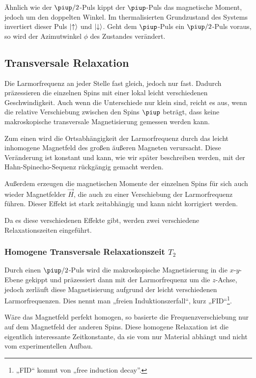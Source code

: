Ähnlich wie der $\piup/2$-Puls kippt der $\piup$-Puls das magnetische Moment,
jedoch um den doppelten Winkel. Im thermalisierten Grundzustand des Systems
invertiert dieser Puls $\ket\uparrow$ und $\ket\downarrow$. Geht dem
$\piup$-Puls ein $\piup/2$-Puls voraus, so wird der Azimutwinkel $\phi$ des
Zustandes verändert.

\subsection{Transversale Relaxation}

Die Larmorfrequenz an jeder Stelle fast gleich, jedoch nur fast. Dadurch
präzessieren die einzelnen Spins mit einer lokal leicht verschiedenen
Geschwindigkeit. Auch wenn die Unterschiede nur klein sind, reicht es aus, wenn
die relative Verschiebung zwischen den Spins $\piup$ beträgt, dass keine
makroskopische transversale Magnetisierung gemessen werden kann.

Zum einen wird die Ortsabhängigkeit der Larmorfrequenz durch das leicht
inhomogene Magnetfeld des großen äußeren Magneten verursacht. Diese Veränderung
ist konstant und kann, wie wir später beschreiben werden, mit der
Hahn-Spinecho-Sequenz rückgängig gemacht werden.

Außerdem erzeugen die magnetischen Momente der einzelnen Spins für sich auch
wieder Magnetfelder $\vec H$, die auch zu einer Verschiebung der Larmorfrequenz
führen. Dieser Effekt ist stark zeitabhängig und kann nicht korrigiert werden.

Da es diese verschiedenen Effekte gibt, werden zwei verschiedene
Relaxationszeiten eingeführt.

\subsubsection{Homogene Transversale Relaxationszeit $T_2$}

Durch einen $\piup/2$-Puls wird die makroskopische Magnetisierung in die
$x$-$y$-Ebene gekippt und präzessiert dann mit der Larmorfrequenz um die
$z$-Achse, jedoch zerläuft diese Magnetisierung aufgrund der leicht
verschiedenen Larmorfrequenzen. Dies nennt man „freien Induktionszerfall“, kurz
„FID“\footnote{„FID“ kommt von „free induction decay”.}.

Wäre das Magnetfeld perfekt homogen, so basierte die Frequenzverschiebung nur
auf dem Magnetfeld der anderen Spins. Diese homogene Relaxation ist die
eigentlich interessante Zeitkonstante, da sie vom nur Material abhängt und
nicht vom experimentellen Aufbau.

